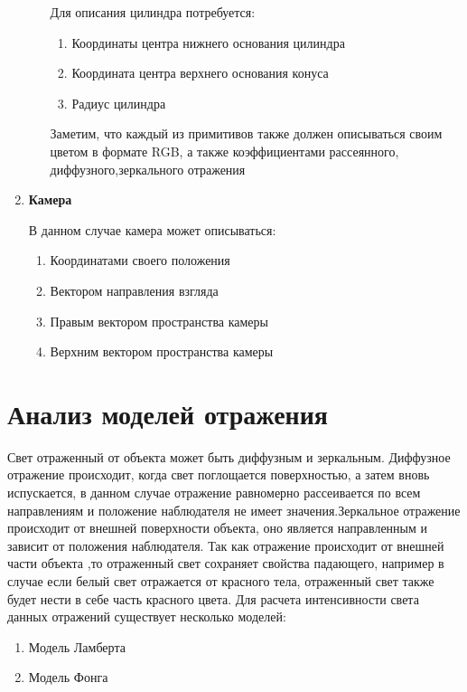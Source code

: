 \documentclass[a4paper,14pt,unknownkeysallowed]{extreport}
\begin{document}
\begin{enumerate}
\begin{enumerate}[label*=\arabic*.]
		Для описания цилиндра потребуется:
		\begin{enumerate}[label*=\arabic*.]
			\item Координаты центра нижнего основания цилиндра
			\item Координата центра верхнего основания конуса
			\item Радиус цилиндра
		\end{enumerate}
		Заметим, что каждый из примитивов также должен описываться своим цветом в формате RGB, а также
		коэффициентами рассеянного, диффузного,зеркального отражения
	\end{enumerate}

	\item \textbf{Камера}
	
	В данном случае камера может описываться:
	\begin{enumerate}[label*=\arabic*.]
		\item Координатами своего положения
		\item Вектором направления взгляда
		\item Правым вектором пространства камеры
		\item Верхним вектором пространства камеры
	\end{enumerate}
	
\end{enumerate}

\section[Анализ моделей отражения]{Анализ моделей отражения}
\label{sec:reflection_models}
Свет отраженный от объекта может быть диффузным и зеркальным.
Диффузное отражение происходит, когда свет поглощается поверхностью, а затем вновь испускается, в данном случае
отражение равномерно рассеивается по всем направлениям и положение наблюдателя не имеет значения.Зеркальное отражение
происходит от внешней поверхности объекта, оно является направленным и зависит от положения наблюдателя.
Так как отражение происходит от внешней части объекта ,то отраженный свет сохраняет свойства падающего, например в случае если белый свет отражается
от красного тела, отраженный свет также будет нести в себе часть красного цвета.
Для расчета интенсивности света данных отражений существует несколько моделей:
\begin{enumerate}
	\item Модель Ламберта
	\item Модель Фонга \cite{Rodgers}
\end{enumerate}
\end{document}
